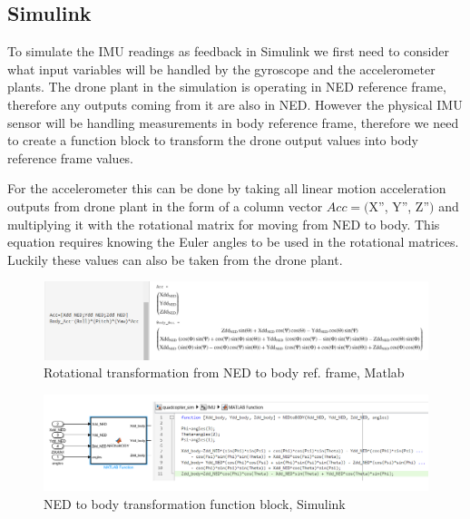 \subsection{Simulink}

To simulate the IMU readings as feedback in Simulink we first need to consider what input variables will be handled by the gyroscope and the accelerometer plants. The drone plant in the simulation is operating in NED reference frame, therefore any outputs coming from it are also in NED. However the physical IMU sensor will be handling measurements in body reference frame, therefore we need to create a function block to transform the drone output values into body reference frame values. 

For the accelerometer this can be done by taking all linear motion acceleration outputs from drone plant in the form of a column vector $Acc=($X'', Y'', Z''$)$ and multiplying it with the rotational matrix for moving from NED to body. This equation requires knowing the Euler angles to be used in the rotational matrices. Luckily these values can also be taken from the drone plant.


\begin{figure}[H]
    \begin{center}
    \includegraphics[scale = 0.5]{pictures/IMU/NED_to_body_acc.png}
    \end{center}
    \caption{Rotational transformation from NED to body ref. frame, Matlab}
    \label{fig:my_label}
\end{figure}

\begin{figure}[H]
    \begin{center}
    \includegraphics[scale = 0.5]{pictures/IMU/NED_to_bidy_function_block.png}
    \end{center}
    \caption{NED to body transformation function block, Simulink}
    \label{fig:my_label}
\end{figure}

